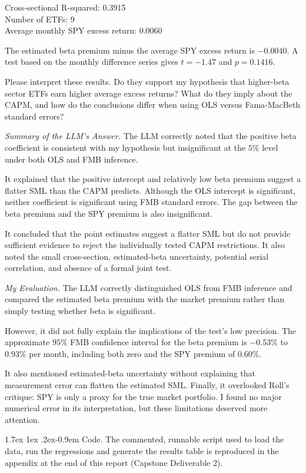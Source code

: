 \documentclass[11pt]{article}
\makeatletter
\renewcommand\paragraph{\@startsection{paragraph}{4}{0pt}%
  {1.7ex \@plus 1ex \@minus .2ex}{-0.9em}%
  {\normalfont\bfseries\normalsize\color{psink}}}
\makeatother
\begin{document}
\noindent Cross-sectional R-squared: 0.3915\\
Number of ETFs: 9\\
Average monthly SPY excess return: 0.0060

The estimated beta premium minus the average SPY excess return is $-0.0040$. A
test based on the monthly difference series gives $t = -1.47$ and
$p = 0.1416$.

Please interpret these results. Do they support my hypothesis that higher-beta
sector ETFs earn higher average excess returns? What do they imply about the
CAPM, and how do the conclusions differ when using OLS versus Fama-MacBeth
standard errors?

\smallskip\noindent\textit{Summary of the LLM's Answer.} The LLM correctly noted that the
positive beta coefficient is consistent with my hypothesis but insignificant at
the $5\%$ level under both OLS and FMB inference.

It explained that the positive intercept and relatively low beta premium
suggest a flatter SML than the CAPM predicts. Although the OLS intercept is
significant, neither coefficient is significant using FMB standard errors. The
gap between the beta premium and the SPY premium is also insignificant.

It concluded that the point estimates suggest a flatter SML but do not provide
sufficient evidence to reject the individually tested CAPM restrictions. It
also noted the small cross-section, estimated-beta uncertainty, potential
serial correlation, and absence of a formal joint test.

\smallskip\noindent\textit{My Evaluation.} The LLM correctly distinguished OLS from FMB
inference and compared the estimated beta premium with the market premium
rather than simply testing whether beta is significant.

However, it did not fully explain the implications of the test's low precision.
The approximate $95\%$ FMB confidence interval for the beta premium is
$-0.53\%$ to $0.93\%$ per month, including both zero and the SPY premium of
$0.60\%$.

It also mentioned estimated-beta uncertainty without explaining that
measurement error can flatten the estimated SML. Finally, it overlooked Roll's
critique: SPY is only a proxy for the true market portfolio. I found no major
numerical error in its interpretation, but these limitations deserved more
attention.

\paragraph{Code.} The commented, runnable script used to load the data, run
the regressions and generate the results table is reproduced in the appendix
at the end of this report (Capstone Deliverable 2).
\end{document}

